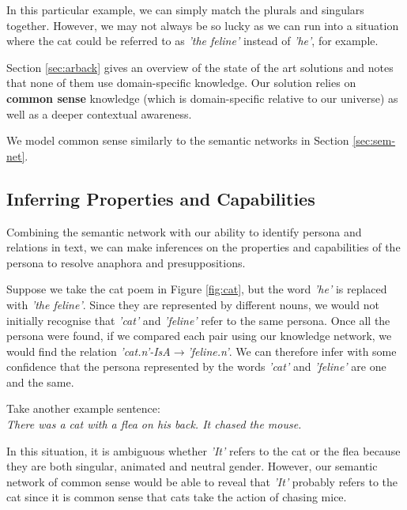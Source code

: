 In this particular example, we can simply match the plurals and singulars together. However, we may not always be so lucky as we can run into a situation where the cat could be referred to as \textit{'the feline'} instead of \textit{'he'}, for example.

Section \ref{sec:arback} gives an overview of the state of the art solutions and notes that none of them use domain-specific knowledge. Our solution relies on \textbf{common sense} knowledge (which is domain-specific relative to our universe) as well as a deeper contextual awareness.

We model common sense similarly to the semantic networks in Section \ref{sec:sem-net}.  


\subsection{Inferring Properties and Capabilities}

Combining the semantic network with our ability to identify persona and relations in text, we can make inferences on the properties and capabilities of the persona to resolve anaphora and presuppositions.

Suppose we take the cat poem in Figure \ref{fig:cat}, but the word \textit{'he'} is replaced with \textit{'the feline'}. Since they are represented by different nouns, we would not initially recognise that \textit{'cat'} and \textit{'feline'} refer to the same persona. Once all the persona were found, if we compared each pair using our knowledge network, we would find the relation \textit{'cat.n'-IsA$\rightarrow$'feline.n'}. We can therefore infer with some confidence that the persona represented by the words \textit{'cat'} and \textit{'feline'} are one and the same.

Take another example sentence:\\
\textit{There was a cat with a flea on his back. It chased the mouse.}

In this situation, it is ambiguous whether \textit{'It'} refers to the cat or the flea because they are both singular, animated and neutral gender. However, our semantic network of common sense would be able to reveal that \textit{'It'} probably refers to the cat since it is common sense that cats take the action of chasing mice.



